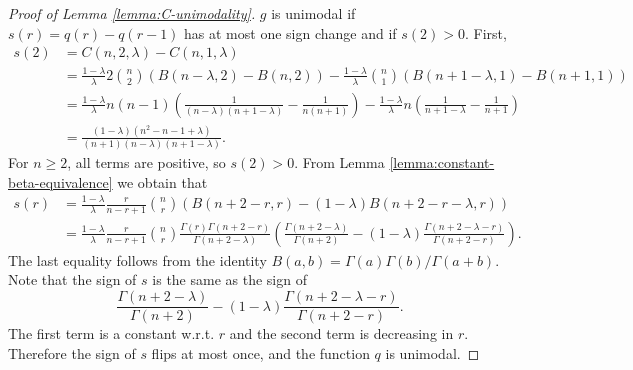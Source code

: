 \documentclass[11pt]{article}
\begin{document}
\begin{proof}[Proof of Lemma \ref{lemma:C-unimodality}]
    $g$ is unimodal if $s(r)=q(r)-q(r-1)$ has at most one sign change and if $s(2)>0$. First,
    \begin{align*}
        s(2)&=C(n,2,\lambda)-C(n,1,\lambda)\\
        &=\frac{1-\lambda}{\lambda}2\binom{n}{2}(B(n-\lambda,2)-B(n,2))-\frac{1-\lambda}{\lambda}\binom{n}{1}(B(n+1-\lambda,1)-B(n+1,1))\\
        &=\frac{1-\lambda}{\lambda}n\left(n-1\right)\left(\frac{1}{\left(n-\lambda\right)\left(n+1-\lambda\right)}-\frac{1}{n\left(n+1\right)}\right)-\frac{1-\lambda}{\lambda}n\left(\frac{1}{n+1-\lambda}-\frac{1}{n+1}\right)\\
        &=\frac{\left(1-\lambda\right)\left(n^{2}-n-1+\lambda\right)}{\left(n+1\right)\left(n-\lambda\right)\left(n+1-\lambda\right)}.
    \end{align*}
    For $n\ge 2$, all terms are positive, so $s(2)>0$. From Lemma \ref{lemma:constant-beta-equivalence} we obtain that
    \begin{align*}
        s(r)&=\frac{1-\lambda}{\lambda}\frac{r}{n-r+1}\binom{n}{r}(B(n+2-r,r)-(1-\lambda)B(n+2-r-\lambda,r))\\
        &=\frac{1-\lambda}{\lambda}\frac{r}{n-r+1}\binom{n}{r}\frac{\Gamma(r)\Gamma(n+2-r)}{\Gamma(n+2-\lambda)}\left(\frac{\Gamma(n+2-\lambda)}{\Gamma(n+2)}-(1-\lambda)\frac{\Gamma(n+2-\lambda-r)}{\Gamma(n+2-r)}\right).
    \end{align*}
    The last equality follows from the identity $B(a,b)=\Gamma(a)\Gamma(b)/\Gamma(a+b)$. Note that the sign of $s$ is the same as the sign of 
    $$
    \frac{\Gamma(n+2-\lambda)}{\Gamma(n+2)}-(1-\lambda)\frac{\Gamma(n+2-\lambda-r)}{\Gamma(n+2-r)}.
    $$
    The first term is a constant w.r.t. $r$ and the second term is decreasing in $r$. Therefore the sign of $s$ flips at most once, and the function $q$ is unimodal.
\end{proof}
\bigskip
\end{document}
